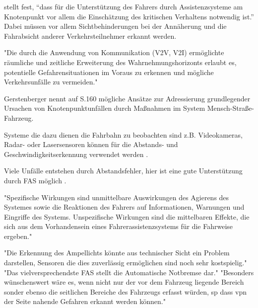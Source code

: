 \Textcite[S.29]{Gerstenberger.17.02.2015} stellt fest, \enquote{dass für die Unterstützung des Fahrers durch Assistenzsysteme am Knotenpunkt vor allem die Einschätzung des kritischen Verhaltens notwendig ist.} Dabei müssen vor allem Sichtbehinderungen bei der Annäherung und die Fahrabsicht anderer Verkehrsteilnehmer erkannt werden.

"Die durch die Anwendung von Kommunikation (V2V, V2I) ermöglichte räumliche und zeitliche Erweiterung des Wahrnehmungshorizonts erlaubt es, potentielle Gefahrensituationen im Voraus zu erkennen und mögliche Verkehrsunfälle zu vermeiden." \parencite[S.59]{Gerstenberger.17.02.2015}

Gerstenberger nennt auf S.160 mögliche Ansätze zur Adressierung grundlegender Ursachen von Knotenpunktunfällen durch Maßnahmen im System Mensch-Straße-Fahrzeug.

Systeme die dazu dienen die Fahrbahn zu beobachten sind z.B. Videokameras, Radar- oder Lasersensoren können für die Abstands- und Geschwindigkeitserkennung verwendet werden \parencite[S.4-5]{Schmidt.2010}.

Viele Unfälle entstehen durch Abstandsfehler, hier ist eine gute Unterstützung durch FAS möglich \parencite[S.25]{Schmidt.2010}.



"Spezifische Wirkungen sind unmittelbare Auswirkungen des Agierens des Systemes sowie die Reaktionen des Fahrers auf Informationen, Warnungen und Eingriffe des Systems. Unspezifische Wirkungen sind die mittelbaren Effekte, die sich aus dem Vorhandensein eines Fahrerassistenzsystems für die Fahrweise ergeben." \parencite[S.50-51]{Grundl.2005}

"Die Erkennung des Ampellichts könnte aus technischer Sicht ein Problem darstellen, Sensoren die dies zuverlässig ermöglichen sind noch sehr kostspielig." \parencite[S.230]{Grundl.2005}%
"Das vielversprechendste FAS stellt die Automatische Notbremse dar." \parencite[S.243]{Grundl.2005}
"Besonders wünschenswert wäre es, wenn nicht nur der vor dem Fahrzeug liegende Bereich sonder ebenso die seitlichen Bereiche des Fahrzeugs erfasst würden, sp dass vpn der Seite nahende Gefahren erkannt werden können." \parencite[S.244]{Grundl.2005}

